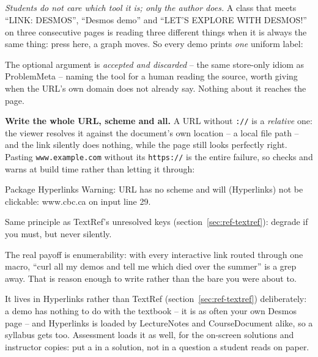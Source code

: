 \subsection*{\texorpdfstring{}{\textbackslash demo}}

\emph{Students do not care which tool it is; only the author does.} A
class that meets ``LINK: DESMOS'', ``Desmos demo'' and ``LET'S EXPLORE
WITH DESMOS!'' on three consecutive pages is reading three different
things when it is always the same thing: press here, a graph moves. So
every demo prints \emph{one} uniform label:

\begin{manexsource}
\end{manexsource}

The optional argument is \emph{accepted and discarded} -- the same
store-only idiom as ProblemMeta -- naming the tool for a human reading
the source, worth giving when the URL's own domain does not already say.
Nothing about it reaches the page.

\textbf{Write the whole URL, scheme and all.} A URL without
\texttt{://} is a \emph{relative} one: the viewer resolves it against the
document's own location -- a local file path -- and the link silently does
nothing, while the page still looks perfectly right. Pasting
\texttt{www.example.com} without its \texttt{https://} is the entire failure,
so  checks and warns at build time rather than letting it through:

\begin{manexsource}
Package Hyperlinks Warning: \demo URL has no scheme and will
(Hyperlinks)                not be clickable: www.cbc.ca on input line 29.
\end{manexsource}

Same principle as TextRef's unresolved keys (section~\ref{sec:ref-textref}):
degrade if you must, but never silently.

The real payoff is enumerability: with every interactive link routed
through one macro, ``curl all my demos and tell me which died over the
summer'' is a grep away. That is reason enough to write  rather
than the bare  you were about to.

It lives in Hyperlinks rather than TextRef (section~\ref{sec:ref-textref})
deliberately: a demo has nothing to do with the textbook -- it is as often
your own Desmos page -- and Hyperlinks is loaded by LectureNotes and
CourseDocument alike, so a syllabus gets  too. Assessment loads
it as well, for the on-screen solutions and instructor copies: put a
 in a solution, not in a question a student reads on paper.

